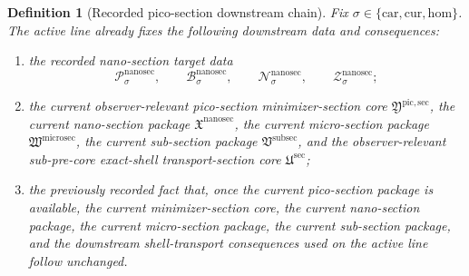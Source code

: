 \documentclass[11pt]{article}
\newcommand{\Car}{\mathrm{car}}
\newcommand{\Cur}{\mathrm{cur}}
\newcommand{\Hom}{\mathrm{hom}}
\newcommand{\SubSectionPackage}{\mathfrak V^{\mathrm{subsec}}}
\newcommand{\MicroSectionPackage}{\mathfrak W^{\mathrm{microsec}}}
\newcommand{\SubPreSectionCore}{\mathfrak U^{\mathrm{sec}}}
\newcommand{\NanoSectionPackage}{\mathfrak X^{\mathrm{nanosec}}}
\newcommand{\NanoSectionSpace}[1]{\mathcal P_{#1}^{\mathrm{nanosec}}}
\newcommand{\NanoSectionBody}[1]{\mathcal B_{#1}^{\mathrm{nanosec}}}
\newcommand{\NanoSectionFunctional}[1]{\mathscr N_{#1}^{\mathrm{nanosec}}}
\newcommand{\NanoSectionShell}[1]{\mathcal Z_{#1}^{\mathrm{nanosec}}}
\newcommand{\PicoMinSectionCore}{\mathfrak Y^{\mathrm{pic,sec}}}
\newtheorem{definition}{Definition}
\begin{document}
\begin{definition}[Recorded pico-section downstream chain]
\label{def:downstream}
Fix \(\sigma\in\{\Car,\Cur,\Hom\}\). The active line already fixes the following downstream data and consequences:
\begin{enumerate}
    \item the recorded nano-section target data
    \[
    \NanoSectionSpace{\sigma},\qquad
    \NanoSectionBody{\sigma},\qquad
    \NanoSectionFunctional{\sigma},\qquad
    \NanoSectionShell{\sigma};
    \]
    \item the current observer-relevant pico-section minimizer-section core \(\PicoMinSectionCore\), the current nano-section package \(\NanoSectionPackage\), the current micro-section package \(\MicroSectionPackage\), the current sub-section package \(\SubSectionPackage\), and the observer-relevant sub-pre-core exact-shell transport-section core \(\SubPreSectionCore\);
    \item the previously recorded fact that, once the current pico-section package is available, the current minimizer-section core, the current nano-section package, the current micro-section package, the current sub-section package, and the downstream shell-transport consequences used on the active line follow unchanged.
\end{enumerate}
\end{definition}
\end{document}
